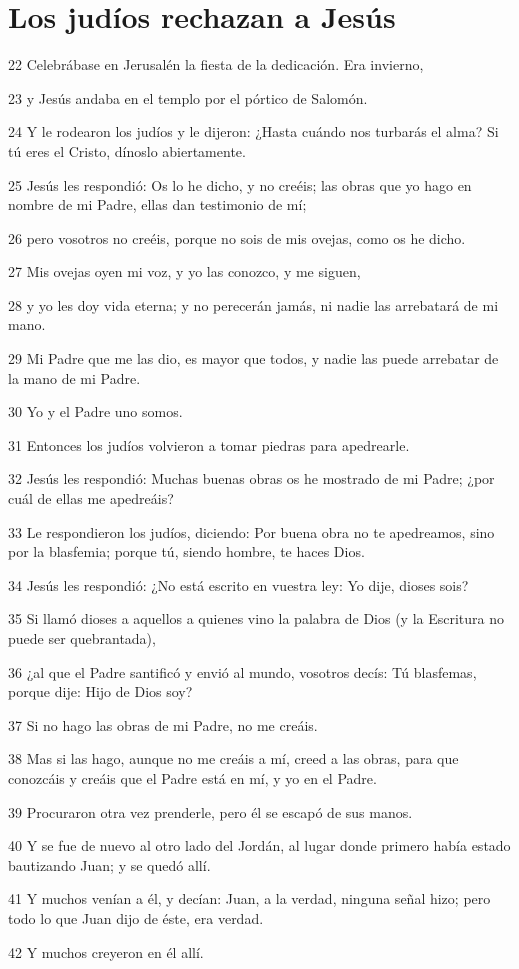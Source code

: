 \section*{Los judíos rechazan a Jesús}

\par 22 Celebrábase en Jerusalén la fiesta de la dedicación. Era invierno,
\par 23 y Jesús andaba en el templo por el pórtico de Salomón.
\par 24 Y le rodearon los judíos y le dijeron: ¿Hasta cuándo nos turbarás el alma? Si tú eres el Cristo, dínoslo abiertamente.
\par 25 Jesús les respondió: Os lo he dicho, y no creéis; las obras que yo hago en nombre de mi Padre, ellas dan testimonio de mí;
\par 26 pero vosotros no creéis, porque no sois de mis ovejas, como os he dicho.
\par 27 Mis ovejas oyen mi voz, y yo las conozco, y me siguen,
\par 28 y yo les doy vida eterna; y no perecerán jamás, ni nadie las arrebatará de mi mano.
\par 29 Mi Padre que me las dio, es mayor que todos, y nadie las puede arrebatar de la mano de mi Padre.
\par 30 Yo y el Padre uno somos.
\par 31 Entonces los judíos volvieron a tomar piedras para apedrearle.
\par 32 Jesús les respondió: Muchas buenas obras os he mostrado de mi Padre; ¿por cuál de ellas me apedreáis?
\par 33 Le respondieron los judíos, diciendo: Por buena obra no te apedreamos, sino por la blasfemia; porque tú, siendo hombre, te haces Dios.
\par 34 Jesús les respondió: ¿No está escrito en vuestra ley: Yo dije, dioses sois?
\par 35 Si llamó dioses a aquellos a quienes vino la palabra de Dios (y la Escritura no puede ser quebrantada),
\par 36 ¿al que el Padre santificó y envió al mundo, vosotros decís: Tú blasfemas, porque dije: Hijo de Dios soy?
\par 37 Si no hago las obras de mi Padre, no me creáis.
\par 38 Mas si las hago, aunque no me creáis a mí, creed a las obras, para que conozcáis y creáis que el Padre está en mí, y yo en el Padre.
\par 39 Procuraron otra vez prenderle, pero él se escapó de sus manos.
\par 40 Y se fue de nuevo al otro lado del Jordán, al lugar donde primero había estado bautizando Juan; y se quedó allí.
\par 41 Y muchos venían a él, y decían: Juan, a la verdad, ninguna señal hizo; pero todo lo que Juan dijo de éste, era verdad.
\par 42 Y muchos creyeron en él allí.

